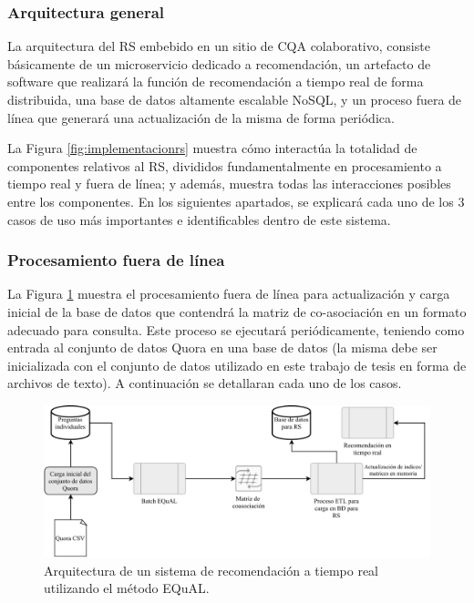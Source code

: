 \subsubsection{Arquitectura general}
La arquitectura del RS embebido en un sitio de CQA colaborativo, consiste básicamente de un microservicio dedicado a recomendación, un artefacto de software que realizará la función de recomendación a tiempo real de forma distribuida, una base de datos altamente escalable NoSQL, y un proceso fuera de línea que generará una actualización de la misma de forma periódica.

\bigskip La Figura \ref{fig:implementacionrs} muestra cómo interactúa la totalidad de componentes relativos al RS, divididos fundamentalmente en procesamiento a tiempo real y fuera de línea; y además, muestra todas las interacciones posibles entre los componentes. En los siguientes apartados, se explicará cada uno de los 3 casos de uso más importantes e identificables dentro de este sistema.

\subsubsection{Procesamiento fuera de línea}
La Figura \ref{fig:implementacionrsbatch} muestra el procesamiento fuera de línea para actualización y carga inicial de la base de datos que contendrá la matriz de co-asociación en un formato adecuado para consulta. Este proceso se ejecutará periódicamente, teniendo como entrada al conjunto de datos Quora en una base de datos (la misma debe ser inicializada con el conjunto de datos utilizado en este trabajo de tesis en forma de archivos de texto). A continuación se detallaran cada uno de los casos.

\bigskip
\begin{figure}[h!]
	\centering
	\includegraphics[width=0.9\linewidth]{8_problema_investigacion/imagenes/implementacion_rs_batch}
	\caption{Arquitectura de un sistema de recomendación a tiempo real utilizando el método EQuAL.}
	\label{fig:implementacionrsbatch}
\end{figure}

